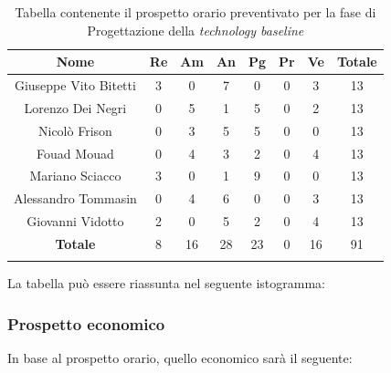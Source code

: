 			\begin{longtable}{|c|c|c|c|c|c|c|c}
				\hline
				\rowcolor{lighter-grayer}
				\textbf{Nome} & \textbf{Re} & \textbf{Am} & \textbf{An} & \textbf{Pg}  & \textbf{Pr}   & \textbf{Ve} & \textbf{Totale} \\
				\hline
				\endfirsthead
				\hline
				Giuseppe Vito Bitetti & 3 & 0 & 7 & 0 & 0 & 3 & 13\\
				\hline
				\hline
				Lorenzo Dei Negri & 0 & 5 & 1 & 5 & 0 & 2 & 13\\
				\hline
				\hline
				Nicolò Frison & 0 & 3 & 5 & 5 & 0 & 0 & 13\\
				\hline
				\hline
				Fouad Mouad & 0 & 4 & 3 & 2 & 0 & 4 & 13 \\
				\hline
				\hline
				Mariano Sciacco & 3 & 0 & 1 & 9 & 0 & 0 & 13\\
				\hline
				\hline
				Alessandro Tommasin & 0 & 4 & 6 & 0 & 0 & 3 & 13\\
				\hline
				\hline
				Giovanni Vidotto & 2 & 0 & 5 & 2 & 0 & 4 & 13\\
				\hline 
				\textbf{Totale} & 8 &  16 & 28 & 23 & 0 & 16 & 91 \\
				\hline
				
				\caption{Tabella contenente il prospetto orario preventivato per la fase di Progettazione della \textit{technology baseline}}
			\end{longtable}
			\pagebreak	
			
			La tabella può essere riassunta nel seguente istogramma:
			
			
		\subsubsection{Prospetto economico}
			In base al prospetto orario, quello economico sarà il seguente: 
			
